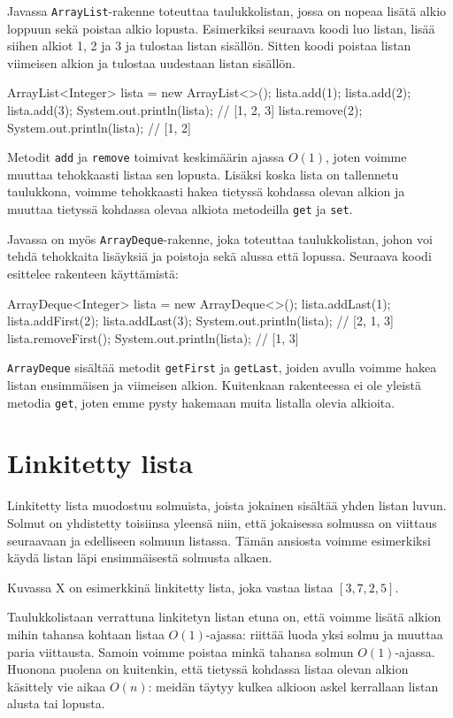 Javassa \texttt{ArrayList}-rakenne toteuttaa taulukkolistan,
jossa on nopeaa lisätä alkio loppuun sekä poistaa alkio lopusta.
Esimerkiksi seuraava koodi luo listan, lisää siihen alkiot
1, 2 ja 3 ja tulostaa listan sisällön.
Sitten koodi poistaa listan viimeisen alkion ja
tulostaa uudestaan listan sisällön.

\begin{code}
ArrayList<Integer> lista = new ArrayList<>();
lista.add(1);
lista.add(2);
lista.add(3);
System.out.println(lista); // [1, 2, 3]
lista.remove(2);
System.out.println(lista); // [1, 2]
\end{code}

Metodit \texttt{add} ja \texttt{remove}
toimivat keskimäärin ajassa $O(1)$,
joten voimme muuttaa tehokkaasti listaa sen lopusta.
Lisäksi koska lista on tallennetu taulukkona,
voimme tehokkaasti hakea tietyssä kohdassa olevan alkion
ja muuttaa tietyssä kohdassa olevaa alkiota
metodeilla \texttt{get} ja \texttt{set}.

Javassa on myös \texttt{ArrayDeque}-rakenne,
joka toteuttaa taulukkolistan, johon voi tehdä tehokkaita
lisäyksiä ja poistoja sekä alussa että lopussa.
Seuraava koodi esittelee rakenteen käyttämistä:

\begin{code}
ArrayDeque<Integer> lista = new ArrayDeque<>();
lista.addLast(1);
lista.addFirst(2);
lista.addLast(3);
System.out.println(lista); // [2, 1, 3]
lista.removeFirst();
System.out.println(lista); // [1, 3]
\end{code}

\texttt{ArrayDeque} sisältää metodit \texttt{getFirst} ja
\texttt{getLast}, joiden avulla voimme hakea listan
ensimmäisen ja viimeisen alkion.
Kuitenkaan rakenteessa ei ole yleistä metodia \texttt{get},
joten emme pysty hakemaan muita listalla olevia alkioita.

\section{Linkitetty lista}

Linkitetty lista muodostuu solmuista, joista jokainen sisältää
yhden listan luvun.
Solmut on yhdistetty toisiinsa yleensä niin,
että jokaisessa solmussa on viittaus seuraavaan ja
edelliseen solmuun listassa.
Tämän ansiosta voimme esimerkiksi käydä listan läpi ensimmäisestä
solmusta alkaen.

Kuvassa X on esimerkkinä linkitetty lista,
joka vastaa listaa $[3,7,2,5]$.

Taulukkolistaan verrattuna linkitetyn listan etuna on,
että voimme lisätä alkion mihin tahansa kohtaan listaa
$O(1)$-ajassa: riittää luoda yksi solmu ja muuttaa paria
viittausta.
Samoin voimme poistaa minkä tahansa solmun $O(1)$-ajassa.
Huonona puolena on kuitenkin, että tietyssä kohdassa listaa
olevan alkion käsittely vie aikaa $O(n)$: meidän täytyy
kulkea alkioon askel kerrallaan listan alusta tai lopusta.

